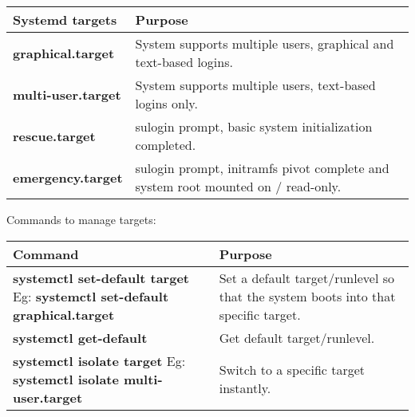 \setlength{\columnsep}{20pt}
\begin{flushleft}

	\begin{tabulary}{1.0\textwidth}{|p{10em}|p{16em}|}
			\toprule
			\textbf{Systemd targets} & \textbf{Purpose}\\
			\midrule
			\textbf{graphical.target} & System supports multiple users, graphical and text-based logins. \\
			\hline
			\textbf{multi-user.target} & System supports multiple users, text-based logins only. \\
			\hline
			\textbf{rescue.target} & sulogin prompt, basic system initialization completed. \\
			\hline
			\textbf{emergency.target} & sulogin prompt, initramfs pivot complete and system root mounted on / read-only.	\\
			\bottomrule
	\end{tabulary}

	Commands to manage targets:

	\begin{tabulary}{1.0\textwidth}{|p{13em}|p{13em}|}
		\toprule
		\textbf{Command} & \textbf{Purpose}\\
		\midrule
		\textbf{systemctl set-default target} \newline Eg: \color{blue} \textbf{systemctl set-default graphical.target} \bigskip   & Set a default target/runlevel so that the system boots into that specific target. \\
		\hline
		\textbf{systemctl get-default} \bigskip & Get default target/runlevel. \\
		\hline
		\textbf{systemctl isolate target} \newline Eg: \color{blue} \textbf{systemctl isolate multi-user.target} \bigskip   & Switch to a specific target instantly. \\
		\bottomrule
	\end{tabulary}


	


\end{flushleft}

\newpage

